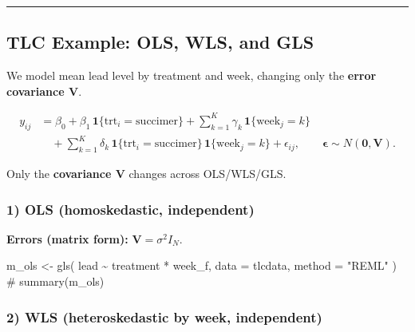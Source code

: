 \documentclass[
  letterpaper,
  DIV=11,
  numbers=noendperiod]{scrreprt}
\newenvironment{Shaded}{\begin{snugshade}}{\end{snugshade}}
\newcommand{\AttributeTok}[1]{\textcolor[rgb]{0.40,0.45,0.13}{#1}}
\newcommand{\CommentTok}[1]{\textcolor[rgb]{0.37,0.37,0.37}{#1}}
\newcommand{\FunctionTok}[1]{\textcolor[rgb]{0.28,0.35,0.67}{#1}}
\newcommand{\NormalTok}[1]{\textcolor[rgb]{0.00,0.23,0.31}{#1}}
\newcommand{\OtherTok}[1]{\textcolor[rgb]{0.00,0.23,0.31}{#1}}
\newcommand{\SpecialCharTok}[1]{\textcolor[rgb]{0.37,0.37,0.37}{#1}}
\newcommand{\StringTok}[1]{\textcolor[rgb]{0.13,0.47,0.30}{#1}}
\begin{document}
\begin{center}\rule{0.5\linewidth}{0.5pt}\end{center}

\hypertarget{tlc-example-ols-wls-and-gls}{%
\subsection*{TLC Example: OLS, WLS, and
GLS}\label{tlc-example-ols-wls-and-gls}}

We model mean lead level by treatment and week, changing only the
\textbf{error covariance V}.

\[
\begin{aligned}
y_{ij} &= \beta_0 
+ \beta_1 \,\mathbf{1}\{\text{trt}_i=\text{succimer}\}
+ \sum_{k=1}^K \gamma_k \,\mathbf{1}\{\text{week}_j=k\} \\
&\quad + \sum_{k=1}^K \delta_k \,\mathbf{1}\{\text{trt}_i=\text{succimer}\}\,\mathbf{1}\{\text{week}_j=k\}
+ \epsilon_{ij},\qquad \boldsymbol{\epsilon}\sim N(\mathbf{0},\mathbf{V}).
\end{aligned}
\]

Only the \textbf{covariance V} changes across OLS/WLS/GLS.

\hypertarget{ols-homoskedastic-independent}{%
\subsubsection*{1) OLS (homoskedastic,
independent)}\label{ols-homoskedastic-independent}}

\textbf{Errors (matrix form):} \(\mathbf{V} = \sigma^2 I_N\).

\begin{Shaded}
\begin{Highlighting}[]
\NormalTok{m\_ols }\OtherTok{\textless{}{-}} \FunctionTok{gls}\NormalTok{(}
\NormalTok{  lead }\SpecialCharTok{\textasciitilde{}}\NormalTok{ treatment }\SpecialCharTok{*}\NormalTok{ week\_f,}
  \AttributeTok{data   =}\NormalTok{ tlcdata,}
  \AttributeTok{method =} \StringTok{"REML"}
\NormalTok{)}
\CommentTok{\# summary(m\_ols)}
\end{Highlighting}
\end{Shaded}

\hypertarget{wls-heteroskedastic-by-week-independent}{%
\subsubsection*{2) WLS (heteroskedastic by week,
independent)}\label{wls-heteroskedastic-by-week-independent}}
\end{document}
